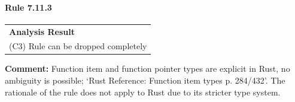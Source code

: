 \paragraph{Rule 7.11.3}
\begin{longtable}{p{13cm}}
\textbf{Analysis Result} \\
(C3) Rule can be dropped completely \\
\end{longtable}
\textbf{Comment:} Function item and function pointer types are explicit in Rust, no ambiguity is possible; `Rust Reference: Function item types p. 284/432'. The rationale of the rule does not apply to Rust due to its stricter type system. \\
